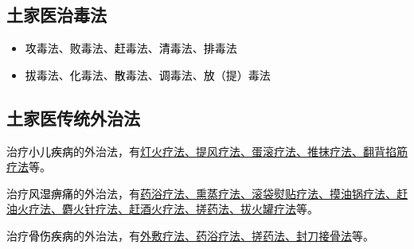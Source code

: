 \documentclass[cn,black,12pt,normal,founder]{elegantnote}
\newcommand{\redt}[1]{\textcolor{black}{{}#1}}      %
\begin{document}
\subsection{土家医治毒法}

\begin{itemize}
  \item \redt{攻}毒法、\redt{败}毒法、\redt{赶}毒法、\redt{清}毒法、\redt{排}毒法
  \item \redt{拔}毒法、\redt{化}毒法、\redt{散}毒法、\redt{调}毒法、\redt{放}（提）毒法
\end{itemize}

\subsection{土家医传统外治法}

治疗\redt{小儿疾病}的外治法，有\uline{灯火疗法、提风疗法、蛋滚疗法、推抹疗法、翻背掐筋} \\ \uline{疗法}等。

治疗\redt{风湿痹痛}的外治法，有\uline{药浴疗法、熏蒸疗法、滚袋熨贴疗法、摸油锅疗法、赶} \\ \uline{油火疗法、麝火针疗法、赶酒火疗法、搓药法、拔火罐疗法}等。

治疗\redt{骨伤疾病}的外治法，有\uline{外敷疗法、药浴疗法、搓药法、封刀接骨法}等。
\end{document}

